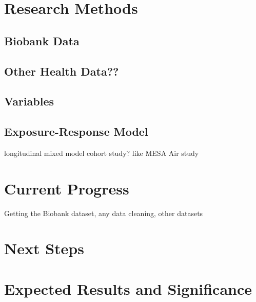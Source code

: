 

\section{Research Methods}
\subsection{Biobank Data}

\subsection{Other Health Data??}

\subsection{Variables}

\subsection{Exposure-Response Model}
longitudinal mixed model cohort study? like MESA Air study

\section{Current Progress}
Getting the Biobank dataset, any data cleaning, other datasets

\section{Next Steps}


\section{Expected Results and Significance}